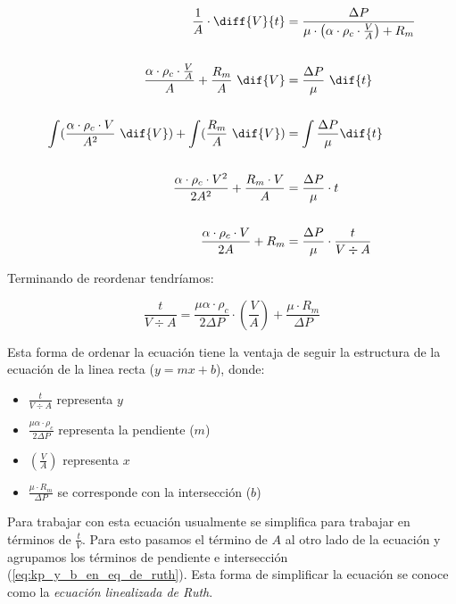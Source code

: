\begin{align*}
    \frac{1}{A} \cdot \diff{V}{t} &= \frac{\Delta P}{\mu \cdot \left(\alpha\cdot\rho_{c}\cdot\frac{V}{A}\right) + R_{m}}
    \\\\
    \frac{\alpha\cdot\rho_{c}\cdot\frac{V}{A}}{A} + \frac{R_{m}}{A} \ \dif{V} &= \frac{\Delta P}{\mu} \ \dif{t}
    \\\\
    \int(\frac{\alpha\cdot\rho_{c}\cdot V}{A^{2}} \ \dif{V}) + \int(\frac{R_{m}}{A} \ \dif{V}) &= \int \frac{\Delta P}{\mu} \dif{t}
    \\\\
    \frac{\alpha\cdot\rho_{c}\cdot V^{2}}{2A^{2}} + \frac{R_{m} \cdot V}{A} &= \frac{\Delta P}{\mu} \cdot t
    \\\\
    \frac{\alpha\cdot\rho_{c}\cdot V}{2A} + R_{m} &= \frac{\Delta P}{\mu} \cdot \frac{t}{V \div A}
\end{align*}

Terminando de reordenar tendríamos:

\begin{equation}\label{eq:ecuacion_de_filtracion_convencional}
    \frac{t}{V \div A} = \frac{\mu\alpha\cdot\rho_{c}}{2\Delta P} \cdot \left(\frac{V}{A}\right) + \frac{\mu \cdot R_{m}}{\Delta P} 
\end{equation}

Esta forma de ordenar la ecuación tiene la ventaja de seguir la estructura de la ecuación de la linea recta ($y=mx+b$), donde:

\begin{itemize}
    \item $\frac{t}{V \div A}$ representa $y$
    \item $\frac{\mu\alpha\cdot\rho_{c}}{2\Delta P}$ representa la pendiente ($m$)
    \item $\left(\frac{V}{A}\right)$ representa $x$
    \item $\frac{\mu \cdot R_{m}}{\Delta P}$ se corresponde con la intersección ($b$)
\end{itemize}

Para trabajar con esta ecuación usualmente se simplifica para trabajar en términos de $\frac{t}{V}$. Para esto pasamos el término de $A$ al otro lado de la ecuación y agrupamos los términos de pendiente e intersección (\autoref{eq:kp_y_b_en_eq_de_ruth}). Esta forma de simplificar la ecuación se conoce como la \emph{ecuación linealizada de Ruth}.

